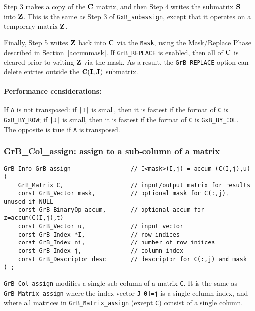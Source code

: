 \documentclass[12pt]{article}
\begin{document}
{Step 3 makes a copy of the ${\bf C}$ matrix, and then Step 4 writes the
submatrix ${\bf S}$ into ${\bf Z}$.  This is the same as Step 3 of
\verb'GxB_subassign', except that it operates on a temporary matrix ${\bf Z}$.

Finally, Step 5 writes ${\bf Z}$ back into ${\bf C}$ via the \verb'Mask', using
the Mask/Replace Phase described in Section~\ref{accummask}.  If
\verb'GrB_REPLACE' is enabled, then all of ${\bf C}$ is cleared prior to
writing ${\bf Z}$ via the mask.  As a result, the \verb'GrB_REPLACE' option can
delete entries outside the ${\bf C(I,J)}$ submatrix.

\paragraph{\bf Performance considerations:} %
If \verb'A' is not transposed: if \verb'|I|' is small, then it is fastest if
the format of \verb'C' is \verb'GxB_BY_ROW'; if \verb'|J|' is small, then it is
fastest if the format of \verb'C' is \verb'GxB_BY_COL'.  The opposite is true
if \verb'A' is transposed.

\newpage
\subsubsection{{\sf GrB\_Col\_assign:} assign to a sub-column of a matrix}
\label{assign_column}

\begin{mdframed}[userdefinedwidth=6in]
{\footnotesize
\begin{verbatim}
GrB_Info GrB_assign                 // C<mask>(I,j) = accum (C(I,j),u)
(
    GrB_Matrix C,                   // input/output matrix for results
    const GrB_Vector mask,          // optional mask for C(:,j), unused if NULL
    const GrB_BinaryOp accum,       // optional accum for z=accum(C(I,j),t)
    const GrB_Vector u,             // input vector
    const GrB_Index *I,             // row indices
    const GrB_Index ni,             // number of row indices
    const GrB_Index j,              // column index
    const GrB_Descriptor desc       // descriptor for C(:,j) and mask
) ;
\end{verbatim} } \end{mdframed}

\verb'GrB_Col_assign' modifies a single sub-column of a matrix \verb'C'.  It is
the same as \verb'GrB_Matrix_assign' where the index vector \verb'J[0]=j' is a
single column index, and where all matrices in \verb'GrB_Matrix_assign' (except
\verb'C') consist of a single column.

}
\end{document}
